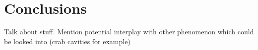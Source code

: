 
\chapter*{Conclusions}

\label{Conclusion} %


Talk about stuff.
Mention potential interplay with other phenomenon which could be looked into (crab cavities for example)

